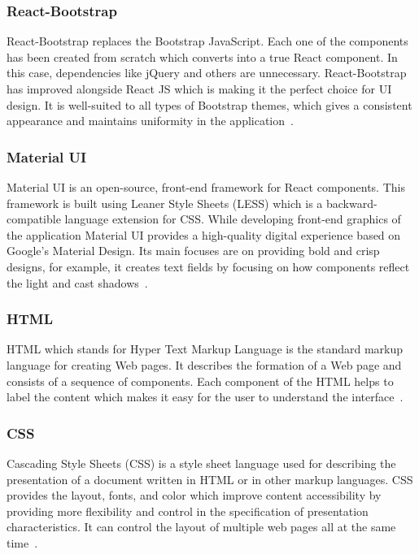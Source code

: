 \subsubsection{React-Bootstrap}
React-Bootstrap replaces the Bootstrap JavaScript. Each one of the components has been created from scratch which converts into a true React component. In this case, dependencies like jQuery and others are unnecessary. React-Bootstrap has improved alongside React JS which is making it the perfect choice for UI design. It is well-suited to all types of Bootstrap themes, which gives a consistent appearance and maintains uniformity in the application~\cite{react-bootstrap}.

\subsubsection{Material UI}
Material UI is an open-source, front-end framework for React components. This framework is built using Leaner Style Sheets (LESS) which is a backward-compatible language extension for CSS. While developing front-end graphics of the application Material UI provides a high-quality digital experience based on Google's Material Design. Its main focuses are on providing bold and crisp designs, for example, it creates text fields by focusing on how components reflect the light and cast shadows~\cite{material-ui-react}.

\subsubsection{HTML}
HTML which stands for Hyper Text Markup Language is the standard markup language for creating Web pages. It describes the formation of a Web page and consists of a sequence of components. Each component of the HTML helps to label the content which makes it easy for the user to understand the interface~\cite{html-intro}.

\subsubsection{CSS}
Cascading Style Sheets (CSS) is a style sheet language used for describing the presentation of a document written in HTML or in other markup languages. CSS provides the layout, fonts, and color which improve content accessibility by providing more flexibility and control in the specification of presentation characteristics. It can control the layout of multiple web pages all at the same time~\cite{css}.

